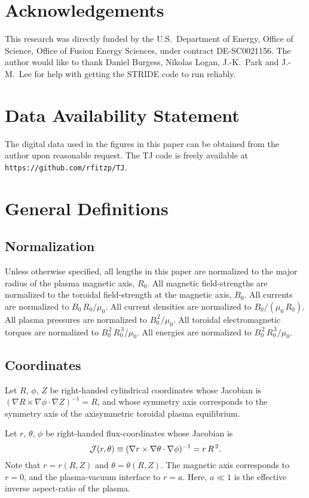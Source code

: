 \documentclass[12pt,prb,aps]{revtex4-1}
\begin{document}
\section*{Acknowledgements}
This research was directly funded by the U.S.\ Department of Energy, Office of Science, Office of Fusion Energy Sciences, under  contract DE-SC0021156. 
The author would like to thank Daniel Burgess, Nikolas Logan, J.-K.~Park and J.-M.~Lee for help with getting the STRIDE code to
run reliably. 

\section*{Data Availability Statement}
The digital data used in the figures in this paper can be obtained from the author upon reasonable request. The TJ code is freely 
available at {\tt https://github.com/rfitzp/TJ}. 

\appendix

\section{General Definitions}
\subsection{Normalization}\label{norm}
Unless otherwise specified, all lengths in this paper are normalized to  the major radius of the plasma magnetic axis, $R_0$. All magnetic field-strengths
are normalized to the  toroidal field-strength at the magnetic axis, $B_0$. All currents are normalized to $B_0\,R_0/\mu_0$. All current densities are normalized to $B_0/(\mu_0\,R_0)$.  All plasma pressures are normalized to $B_0^{\,2}/\mu_0$.
All toroidal electromagnetic torques are normalized to $B_0^{\,2}\,R_0^{\,3}/\mu_0$. All energies are normalized to $B_0^{\,2}\,R_0^{\,3}/\mu_0$. 

\subsection{Coordinates}\label{coord}
Let $R$, $\phi$, $Z$ be right-handed cylindrical coordinates whose Jacobian 
is $ (\nabla R\times \nabla\phi\cdot\nabla Z)^{-1} = R$, 
and whose symmetry axis corresponds to the symmetry axis of the axisymmetric toroidal plasma equilibrium. 

Let $r$, $\theta$, $\phi$ be right-handed flux-coordinates whose
Jacobian is
\begin{equation}\label{jac}
{\cal J}(r,\theta)\equiv (\nabla r\times \nabla\theta\cdot\nabla\phi)^{-1}= r\,R^{\,2}.
\end{equation}
Note that $r=r(R,Z)$ and $\theta=\theta(R,Z)$. 
The magnetic axis corresponds to $r=0$, and the plasma-vacuum interface to $r=a$. Here, $a\ll 1$ is the effective inverse aspect-ratio of the plasma. 
\end{document}
